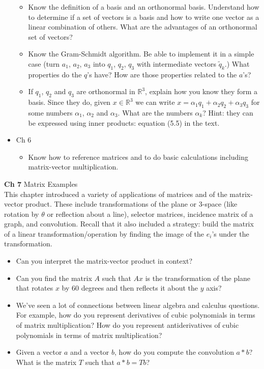 \documentclass[11pt,fleqn]{article}
\newcommand{\Reals}{\mathbb{R}}
\begin{document}
\begin{itemize}
\begin{itemize}
		\item Know the definition of a basis and an orthonormal basis. Understand how to determine if a set of vectors is a basis and how to write one vector as a linear combination of others. What are the advantages of an orthonormal set of vectors?
		\item Know the Gram-Schmidt algorithm.  Be able to implement it in a simple case
(turn $a_1$, $a_2$, $a_3$ into $q_1$, $q_2$, $q_3$ with intermediate vectors
$\tilde q_k$.)  What properties do the $q$'s have? How are those properties related to the $a$'s?
		\item If $q_1$, $q_2$ and $q_3$ are orthonormal in $\Reals^3$, explain how you know they form a basis.  Since they do, given
$x\in\Reals^3$ we can write $x = \alpha_1 q_1+\alpha_2 q_2+ \alpha_3 q_3$
for some numbers $\alpha_1$, $\alpha_2$ and $\alpha_3$.  What are the numbers
$\alpha_k$?  Hint: they can be expressed using inner products: equation (5.5) in the text.
		\end{itemize}
	\item Ch 6
		\begin{itemize}
		\item Know how to reference matrices and to do basic calculations including matrix-vector multiplication.
		\end{itemize}
\end{itemize}
\noindent\textbf{Ch 7} Matrix Examples\\

This chapter introduced a variety of applications of matrices and of the matrix-vector product. These include transformations of the plane or 3-space (like rotation by $\theta$ or reflection about a line), selector matrices, incidence matrix of a graph, and convolution. Recall that it also included a strategy: build the matrix of a linear transformation/operation by finding the image of the $e_i$'s under the transformation.\\

\begin{itemize}
	\item Can you interpret the matrix-vector product in context?
	\item Can you find the matrix $A$ such that $Ax$  is the transformation of the plane that rotates $x$ by 60 degrees and then reflects it about the $y$ axis?
	\item We've seen a lot of connections between linear algebra and calculus questions.
For example, how do you represent derivatives of cubic polynomials in terms 
of matrix multiplication?  How do you represent
antiderivatives of cubic polynomials in terms of matrix multiplication?
	\item Given a vector $a$ and a vector $b$, how do you compute the convolution $a*b$?
What is the matrix $T$ such that $a*b = Tb$?
\end{itemize}
\end{document}
